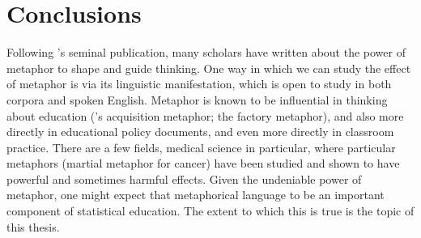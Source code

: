 \section{Conclusions}

Following \citeauthor{lakoff1980}'s seminal publication, many scholars
have written about the power of metaphor to shape and guide thinking.
One way in which we can study the effect of metaphor is via its
linguistic manifestation, which is open to study in both corpora and
spoken English.  Metaphor is known to be influential in thinking about
education (\citeauthor{sfard1998}'s acquisition metaphor; the factory
metaphor), and also more directly in educational policy documents, and
even more directly in classroom practice.  There are a few fields,
medical science in particular, where particular metaphors (martial
metaphor for cancer) have been studied and shown to have powerful and
sometimes harmful effects.  Given the undeniable power of metaphor,
one might expect that metaphorical language to be an important
component of statistical education.  The extent to which this is true
is the topic of this thesis.

